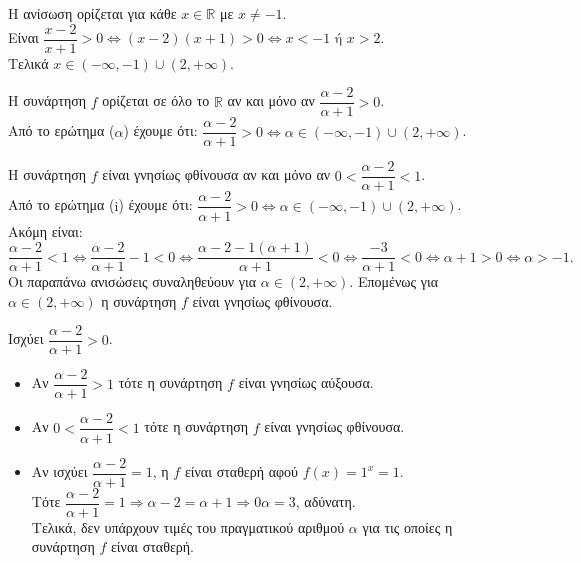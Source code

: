 \begin{alist}
\item Η ανίσωση ορίζεται για κάθε $x \in \mathbb{R}$ με $x \ne -1$. \\
Είναι $\dfrac{x-2}{x+1} > 0 \Leftrightarrow (x-2)(x+1) > 0 \Leftrightarrow x < -1 \text{ ή } x > 2$. \\
Τελικά $x \in (-\infty, -1) \cup (2, +\infty)$.
\item 
\begin{rlist}
\item Η συνάρτηση $f$ ορίζεται σε όλο το $\mathbb{R}$ αν και μόνο αν $\dfrac{\alpha-2}{\alpha+1} > 0$. \\
Από το ερώτημα ($\alpha$) έχουμε ότι: $\dfrac{\alpha-2}{\alpha+1} > 0 \Leftrightarrow \alpha \in (-\infty, -1) \cup (2, +\infty)$.
\item Η συνάρτηση $f$ είναι γνησίως φθίνουσα αν και μόνο αν $0 < \dfrac{\alpha-2}{\alpha+1} < 1$. \\
Από το ερώτημα ($\text{i}$) έχουμε ότι: $\dfrac{\alpha-2}{\alpha+1} > 0 \Leftrightarrow \alpha \in (-\infty, -1) \cup (2, +\infty)$. \\
Ακόμη είναι:
\[\frac{\alpha-2}{\alpha+1} < 1 \Leftrightarrow \frac{\alpha-2}{\alpha+1} - 1 < 0 \Leftrightarrow \frac{\alpha-2-1(\alpha+1)}{\alpha+1} < 0 \Leftrightarrow \frac{-3}{\alpha+1} < 0 \Leftrightarrow \alpha+1 > 0 \Leftrightarrow \alpha > -1.\]
Οι παραπάνω ανισώσεις συναληθεύουν για $\alpha \in (2, +\infty)$. Επομένως για $\alpha \in (2, +\infty)$ η συνάρτηση $f$ είναι γνησίως φθίνουσα.
\item Ισχύει $\dfrac{\alpha-2}{\alpha+1} > 0$.
\begin{itemize}
\item Αν $\dfrac{\alpha-2}{\alpha+1} > 1$ τότε η συνάρτηση $f$ είναι γνησίως αύξουσα.
\item Αν $0 < \dfrac{\alpha-2}{\alpha+1} < 1$ τότε η συνάρτηση $f$ είναι γνησίως φθίνουσα.
\item Αν ισχύει $\dfrac{\alpha-2}{\alpha+1} = 1$, η $f$ είναι σταθερή αφού $f(x) = 1^x = 1$. \\
Τότε $\dfrac{\alpha-2}{\alpha+1} = 1 \Rightarrow \alpha-2 = \alpha+1 \Rightarrow 0\alpha = 3$, αδύνατη. \\
Τελικά, δεν υπάρχουν τιμές του πραγματικού αριθμού $\alpha$ για τις οποίες η συνάρτηση $f$ είναι σταθερή.
\end{itemize}
\end{rlist}
\end{alist}

